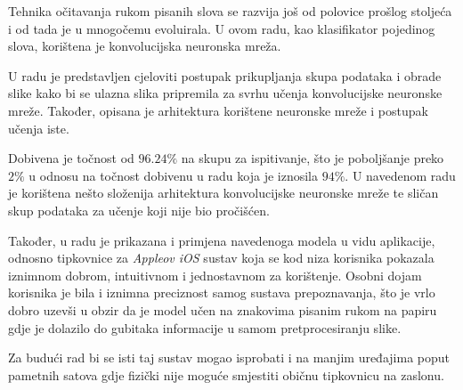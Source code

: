Tehnika očitavanja rukom pisanih slova se razvija još od polovice prošlog stoljeća i od tada je u mnogočemu evoluirala. U ovom radu, kao klasifikator pojedinog slova, korištena je konvolucijska neuronska mreža.

U radu je predstavljen cjeloviti postupak prikupljanja skupa podataka i obrade slike kako bi se ulazna slika pripremila za svrhu učenja konvolucijske neuronske mreže. Također, opisana je arhitektura korištene neuronske mreže i postupak učenja iste.

Dobivena je točnost od $96.24 \%$ na skupu za ispitivanje, što je poboljšanje preko $2 \%$ u odnosu na točnost dobivenu u radu \cite{seminar} koja je iznosila $94 \%$. U navedenom radu je korištena nešto složenija arhitektura konvolucijske neuronske mreže te sličan skup podataka za učenje koji nije bio pročišćen.

Također, u radu je prikazana i primjena navedenoga modela u vidu aplikacije, odnosno tipkovnice za \emph{Appleov iOS} sustav koja se kod niza korisnika pokazala iznimnom dobrom, intuitivnom i jednostavnom za korištenje. Osobni dojam korisnika je bila i iznimna preciznost samog sustava prepoznavanja, što je vrlo dobro uzevši u obzir da je model učen na znakovima pisanim rukom na papiru gdje je dolazilo do gubitaka informacije u samom pretprocesiranju slike.

Za budući rad bi se isti taj sustav mogao isprobati i na manjim uređajima poput pametnih satova gdje fizički nije moguće smjestiti običnu tipkovnicu na zaslonu.